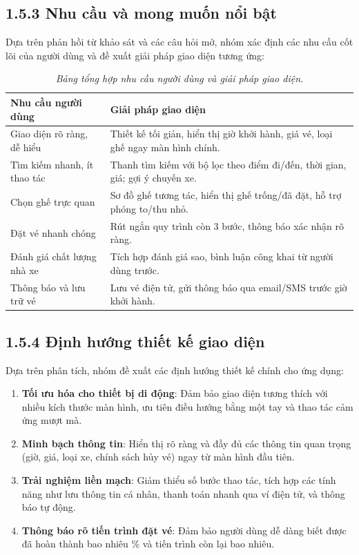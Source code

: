 \subsection*{1.5.3 Nhu cầu và mong muốn nổi bật}
Dựa trên phản hồi từ khảo sát và các câu hỏi mở, nhóm xác định các nhu cầu cốt lõi của người dùng và đề xuất giải pháp giao diện tương ứng:

\begin{table}[h]
\centering
\begin{tabular}{|p{4.5cm}|p{8.5cm}|}
\hline
\textbf{Nhu cầu người dùng} & \textbf{Giải pháp giao diện} \\
\hline
Giao diện rõ ràng, dễ hiểu & Thiết kế tối giản, hiển thị giờ khởi hành, giá vé, loại ghế ngay màn hình chính. \\
\hline
Tìm kiếm nhanh, ít thao tác & Thanh tìm kiếm với bộ lọc theo điểm đi/đến, thời gian, giá; gợi ý chuyến xe. \\
\hline
Chọn ghế trực quan & Sơ đồ ghế tương tác, hiển thị ghế trống/đã đặt, hỗ trợ phóng to/thu nhỏ. \\
\hline
Đặt vé nhanh chóng & Rút ngắn quy trình còn 3 bước, thông báo xác nhận rõ ràng. \\
\hline
Đánh giá chất lượng nhà xe & Tích hợp đánh giá sao, bình luận công khai từ người dùng trước. \\
\hline
Thông báo và lưu trữ vé & Lưu vé điện tử, gửi thông báo qua email/SMS trước giờ khởi hành. \\
\hline
\end{tabular}
\caption{\textit{Bảng tổng hợp nhu cầu người dùng và giải pháp giao diện.}}
\label{table2}
\end{table}

\subsection*{1.5.4 Định hướng thiết kế giao diện}
Dựa trên phân tích, nhóm đề xuất các định hướng thiết kế chính cho ứng dụng:
\begin{enumerate}
    \item \textbf{Tối ưu hóa cho thiết bị di động}: Đảm bảo giao diện tương thích với nhiều kích thước màn hình, ưu tiên điều hướng bằng một tay và thao tác cảm ứng mượt mà.
    \item \textbf{Minh bạch thông tin}: Hiển thị rõ ràng và đầy đủ các thông tin quan trọng (giờ, giá, loại xe, chính sách hủy vé) ngay từ màn hình đầu tiên.
    \item \textbf{Trải nghiệm liền mạch}: Giảm thiểu số bước thao tác, tích hợp các tính năng như lưu thông tin cá nhân, thanh toán nhanh qua ví điện tử, và thông báo tự động.
    \item \textbf{Thông báo rõ tiến trình đặt vé}: Đảm bảo người dùng dễ dàng biết được đã hoàn thành bao nhiêu \% và tiến trình còn lại bao nhiêu.
\end{enumerate}

